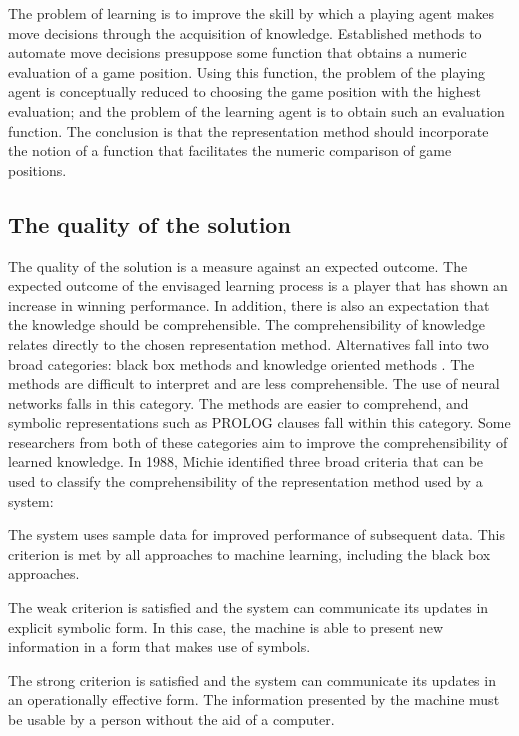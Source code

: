 The problem of learning is to improve the skill by which a playing agent makes move decisions through the acquisition of knowledge.  Established methods to automate move decisions presuppose some function that obtains a numeric evaluation of a game position.  Using this function, the problem of the playing agent is conceptually reduced to choosing the game position with the highest evaluation; and the problem of the learning agent is to obtain such an evaluation function.  The conclusion is that the representation method should incorporate the notion of a function that facilitates the numeric comparison of game positions.  

\subsection*{The quality of the solution} 
The quality of the solution is a measure against an expected outcome.  The expected outcome of the envisaged learning process is a player that has shown an increase in winning performance.  In addition, there is also an expectation that the knowledge should be comprehensible. The comprehensibility of knowledge relates directly to the chosen representation method. Alternatives fall into two broad categories:   black box methods and knowledge oriented methods \cite{kubat:review}.  The  methods are difficult to interpret and are less comprehensible.  The use of neural networks falls in this category.  The  methods are easier to comprehend, and symbolic representations such as PROLOG clauses fall within this category.  Some researchers from both of these categories aim to improve the comprehensibility of learned knowledge. In 1988, Michie \cite{michie:next}  identified three broad criteria that can be used to classify the comprehensibility of the representation method used by a system:
\begin{mydesclist}
\item[Weak criterion.\ ] 
The system uses sample data for improved performance of subsequent data.  This criterion is met by all approaches to machine learning, including the black box approaches.
\item[Strong criterion.\ ]
The weak criterion is satisfied and the system can communicate its updates in explicit symbolic form.  In this case, the machine is able to present new information in a form that makes use of symbols.
\item[Ultra-strong criterion.\ ]
The strong criterion is satisfied and the system can communicate its updates in an operationally effective form.  The information presented by the machine must be usable by a person without the aid of a computer.  
\end{mydesclist}

